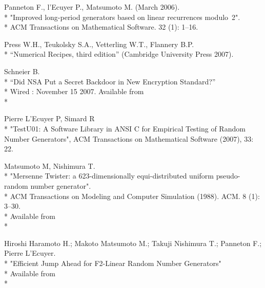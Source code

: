 \documentclass[letterpaper,12pt]{article}
\begin{document}
\begin{thebibliography}{99}
\begin{samepage}
  Panneton F., l'Ecuyer P., Matsumoto M. (March 2006).\\*
  "Improved long-period generators based on linear recurrences modulo~2".\\*
  ACM Transactions on Mathematical Software. 32 (1): 1–16. 
\end{samepage}

\begin{samepage}
  Press W.H., Teukolsky S.A., Vetterling W.T., Flannery B.P.\\*
  ``Numerical Recipes, third edition'' (Cambridge University Press 2007).
\end{samepage}

\begin{samepage}
  Schneier B.\\*
  ``Did NSA Put a Secret Backdoor in New Encryption Standard?''\\*
  Wired : November 15 2007. Available from\\*
\end{samepage}

  Pierre L’Ecuyer P, Simard R\\*
  "TestU01: A Software Library in ANSI C for Empirical Testing of Random
  Number Generators",
  ACM Transactions on Mathematical Software (2007), 33: 22.

\begin{samepage}
  Matsumoto M, Nishimura T.\\*
  "Mersenne Twister: a 623-dimensionally equi-distributed uniform
  pseudo-random number generator".\\*
  ACM Transactions on Modeling and Computer Simulation (1988). ACM. 8 (1):
  3–30.\\*
  Available from\\*
\end{samepage}

\begin{samepage}
  Hiroshi Haramoto H.; Makoto Matsumoto M.; Takuji Nishimura T.;  Panneton F.;
  Pierre L’Ecuyer.\\*
  "Efficient Jump Ahead for F2-Linear Random Number Generators"\\*
  Available from\\*
\end{samepage}


\end{thebibliography}
\end{document}
